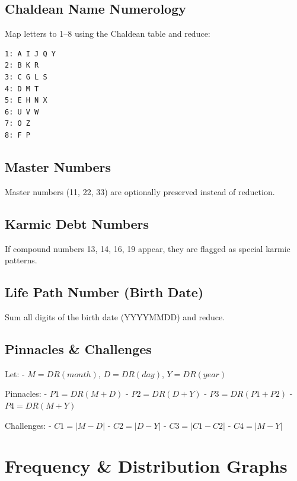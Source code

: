 \documentclass[
  11pt,
  a4paper,
  oneside,
  openany]{article}
\begin{document}
\subsection{Chaldean Name Numerology}\label{chaldean-name-numerology}

Map letters to 1--8 using the Chaldean table and reduce:

\begin{verbatim}
1: A I J Q Y
2: B K R
3: C G L S
4: D M T
5: E H N X
6: U V W
7: O Z
8: F P
\end{verbatim}

\subsection{Master Numbers}\label{master-numbers}

Master numbers (11, 22, 33) are optionally preserved instead of
reduction.

\subsection{Karmic Debt Numbers}\label{karmic-debt-numbers}

If compound numbers 13, 14, 16, 19 appear, they are flagged as special
karmic patterns.

\subsection{Life Path Number (Birth
Date)}\label{life-path-number-birth-date}

Sum all digits of the birth date (YYYYMMDD) and reduce.

\subsection{Pinnacles \& Challenges}\label{pinnacles-challenges}

Let: - \(M = DR(month)\), \(D = DR(day)\), \(Y = DR(year)\)

Pinnacles: - \(P1 = DR(M + D)\) - \(P2 = DR(D + Y)\) -
\(P3 = DR(P1 + P2)\) - \(P4 = DR(M + Y)\)

Challenges: - \(C1 = |M - D|\) - \(C2 = |D - Y|\) - \(C3 = |C1 - C2|\) -
\(C4 = |M - Y|\)

\section{Frequency \& Distribution
Graphs}\label{frequency-distribution-graphs}
\end{document}
